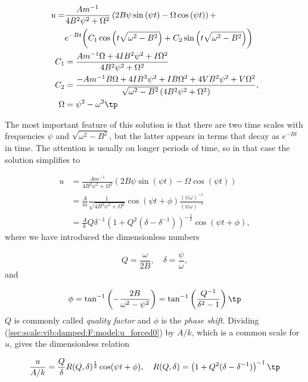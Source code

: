 \documentclass[graybox,envcountchap,sectrefs,final]{svmonodo}
\begin{document}
\begin{align*} u = &
\frac{Am^{-1}}{4 B^{2} \psi^{2} +
\Omega^{2}} \left(2 B \psi
\sin{\left (\psi t \right )} - \Omega\cos{\left (\psi t \right )}\right) + \\ 
&
{e^{-B t}} \biggl(
C_1 \cos{\left( t \sqrt{\omega^{2}- B^{2}}\right)} +
C_2 \sin{\left (t \sqrt{\omega^{2}- B^{2}}\right )}\biggr)\\ 
C_1 &= \frac{Am^{-1} \Omega + 4 I B^{2} \psi^{2} +
I\Omega^2}{
4 B^{2} \psi^{2} + \Omega^2}\\ 
C_2 &=
\frac{- Am^{-1} B\Omega + 4 I B^{3} \psi^{2} +
I B\Omega^2 + 4 V B^{2}\psi^{2} +
V\Omega^2}{
\sqrt{\omega^{2} - B^{2}}
\left(4 B^{2} \psi^{2} + \Omega^2\right)},\\ 
\Omega &= \psi^2 - \omega^2\tp
\end{align*}


The most important feature of this solution is that there are
two time scales with frequencies $\psi$ and $\sqrt{\omega^2 - B^2}$,
but the latter appears in terms that decay as $e^{-Bt}$ in time.
The attention is usually on longer periods of time, so in that
case the solution simplifies to

\begin{align}
u &= \frac{Am^{-1}}{4 B^{2} \psi^{2} +
\Omega^{2}} \left(2 B \psi
\sin{\left (\psi t \right )} - \Omega\cos{\left (\psi t \right )}\right)
\nonumber\\ 
&= \frac{A}{m}\frac{1}{\sqrt{4B^2\psi^2 + \Omega^2}}\cos(\psi t + \phi)
\frac{(\psi\omega)^{-1}}{(\psi\omega)^{-1}}
\nonumber\\ 
& = \frac{A}{k} Q\delta^{-1}\left(1 + Q^2(\delta - \delta^{-1})\right)^{-
\frac{1}{2}}\cos(\psi t + \phi),
\label{sec:scale:vib:damped:F:model:u_forced0}
\end{align}
where we have introduced the dimensionless numbers

\[ Q = \frac{\omega}{2B},\quad\delta = \frac{\psi}{\omega},\]
and

\[ \phi = \tan^{-1}\left(-\frac{2B}{\omega^2 - \psi^2}\right)
= \tan^{-1}\left(\frac{Q^{-1}}{\delta^2 - 1}\right)\tp\]
$Q$ is commonly called \emph{quality factor} and $\phi$ is the
\emph{phase shift}. Dividing
(\ref{sec:scale:vib:damped:F:model:u_forced0}) by $A/k$, which is a common
scale for $u$, gives the dimensionless relation

\begin{equation}
\frac{u}{A/k} = \frac{Q}{\delta} R(Q,\delta)^{\frac{1}{2}}\cos(\psi t + \phi),
\quad
R(Q,\delta) = \left(1 + Q^2(\delta - \delta^{-1})\right)^{-1}\tp
\label{sec:scale:vib:damped:F:model:u_forced}
\end{equation}
\end{document}
